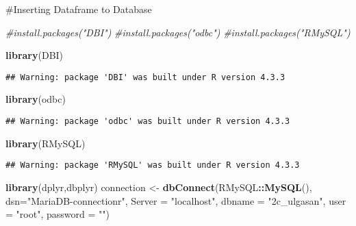 \documentclass[
]{article}
\newenvironment{Shaded}{\begin{snugshade}}{\end{snugshade}}
\newcommand{\AttributeTok}[1]{\textcolor[rgb]{0.13,0.29,0.53}{#1}}
\newcommand{\CommentTok}[1]{\textcolor[rgb]{0.56,0.35,0.01}{\textit{#1}}}
\newcommand{\FunctionTok}[1]{\textcolor[rgb]{0.13,0.29,0.53}{\textbf{#1}}}
\newcommand{\NormalTok}[1]{#1}
\newcommand{\OtherTok}[1]{\textcolor[rgb]{0.56,0.35,0.01}{#1}}
\newcommand{\SpecialCharTok}[1]{\textcolor[rgb]{0.81,0.36,0.00}{\textbf{#1}}}
\newcommand{\StringTok}[1]{\textcolor[rgb]{0.31,0.60,0.02}{#1}}
\begin{document}
\#Inserting Dataframe to Database

\begin{Shaded}
\begin{Highlighting}[]
\CommentTok{\#install.packages("DBI")}
\CommentTok{\#install.packages("odbc")}
\CommentTok{\#install.packages("RMySQL")}


\FunctionTok{library}\NormalTok{(DBI)}
\end{Highlighting}
\end{Shaded}

\begin{verbatim}
## Warning: package 'DBI' was built under R version 4.3.3
\end{verbatim}

\begin{Shaded}
\begin{Highlighting}[]
\FunctionTok{library}\NormalTok{(odbc)}
\end{Highlighting}
\end{Shaded}

\begin{verbatim}
## Warning: package 'odbc' was built under R version 4.3.3
\end{verbatim}

\begin{Shaded}
\begin{Highlighting}[]
\FunctionTok{library}\NormalTok{(RMySQL)}
\end{Highlighting}
\end{Shaded}

\begin{verbatim}
## Warning: package 'RMySQL' was built under R version 4.3.3
\end{verbatim}

\begin{Shaded}
\begin{Highlighting}[]
\FunctionTok{library}\NormalTok{(dplyr,dbplyr)}
\NormalTok{connection }\OtherTok{\textless{}{-}} \FunctionTok{dbConnect}\NormalTok{(RMySQL}\SpecialCharTok{::}\FunctionTok{MySQL}\NormalTok{(),}
                        \AttributeTok{dsn=}\StringTok{"MariaDB{-}connectionr"}\NormalTok{,}
                        \AttributeTok{Server =} \StringTok{"localhost"}\NormalTok{,}
                        \AttributeTok{dbname =} \StringTok{"2c\_ulgasan"}\NormalTok{, }
                        \AttributeTok{user =} \StringTok{"root"}\NormalTok{, }
                        \AttributeTok{password =} \StringTok{""}\NormalTok{) }
\end{Highlighting}
\end{Shaded}
\end{document}
